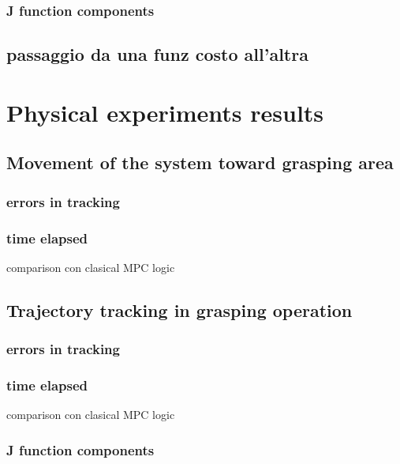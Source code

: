 		\subsubsection{J function components}
		
		\subsection{passaggio da una funz costo all'altra}
	
\section{Physical experiments results}
	
	\subsection{Movement of the system toward grasping area}

		\subsubsection{errors in tracking}
			
		\subsubsection{time elapsed}
			comparison con clasical MPC logic

	\subsection{Trajectory tracking in grasping operation}

		\subsubsection{errors in tracking}
			
		\subsubsection{time elapsed}
			comparison con clasical MPC logic
		\subsubsection{J function components}
